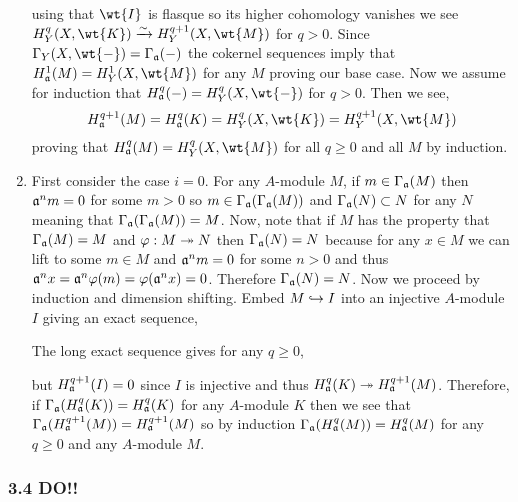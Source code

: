 \documentclass[12pt]{article}
\begin{document}
\begin{enumerate}
\begin{center}
\end{center}
using that $\wt{I}$ is flasque so its higher cohomology vanishes we see $H^q_Y(X, \wt{K}) \iso H^{q+1}_Y(X, \wt{M})$ for $q > 0$. Since $\Gamma_Y(X, \wt{-}) = \Gamma_\a(-)$ the cokernel sequences imply that $H^1_\a(M) = H^1_Y(X, \wt{M})$ for any $M$ proving our base case.
Now we assume for induction that $H^q_\a(-) = H^q_Y(X, \wt{-})$ for $q > 0$. Then we see,
\[ H^{q+1}_\a(M) = H^q_\a(K) = H^q_Y(X, \wt{K}) = H^{q+1}_Y(X, \wt{M}) \]
proving that $H^q_\a(M) = H^q_Y(X, \wt{M})$ for all $q \ge 0$ and all $M$ by induction.

\item First consider the case $i = 0$. For any $A$-module $M$, if $m \in \Gamma_{\mathfrak{a}}(M)$ then $\mathfrak{a}^n m = 0$ for some $m > 0$ so $m \in \Gamma_{\mathfrak{a}}(\Gamma_{\mathfrak{a}}(M))$ and $\Gamma_{\mathfrak{a}}(N) \subset N$ for any $N$ meaning that $\Gamma_{\mathfrak{a}}(\Gamma_{\mathfrak{a}}(M)) = M$. Now, note that if $M$ has the property that $\Gamma_{\mathfrak{a}}(M) = M$ and $\varphi : M \twoheadrightarrow N$ then $\Gamma_{\mathfrak{a}}(N) = N$ because for any $x \in M$ we can lift to some $m \in M$ and $\mathfrak{a}^n m = 0$ for some $n > 0$ and thus $\mathfrak{a}^n x = \mathfrak{a}^n \varphi(m)= \varphi(\mathfrak{a}^n x) = 0$. Therefore $\Gamma_{\mathfrak{a}}(N) = N$. Now we proceed by induction and dimension shifting. Embed $M \hookrightarrow I$ into an injective $A$-module $I$ giving an exact sequence,
\begin{center}
\end{center}
The long exact sequence gives for any $q \ge 0$,
\begin{center}
\end{center}
but $H^{q+1}_{\mathfrak{a}}(I) = 0$ since $I$ is injective and thus $H^q_{\mathfrak{a}}(K) \twoheadrightarrow H^{q+1}_{\mathfrak{a}}(M)$. Therefore, if $\Gamma_{\mathfrak{a}}(H^q_{\mathfrak{a}}(K)) = H^q_{\mathfrak{a}}(K)$ for any $A$-module $K$ then we see that $\Gamma_{\mathfrak{a}}(H^{q+1}_{\mathfrak{a}}(M)) = H^{q+1}_{\mathfrak{a}}(M)$ so by induction $\Gamma_{\mathfrak{a}}(H^{q}_{\mathfrak{a}}(M)) = H^q_{\mathfrak{a}}(M)$ for any $q \ge 0$ and any $A$-module $M$.
\end{enumerate}

\subsubsection{3.4 DO!!}
\end{document}
